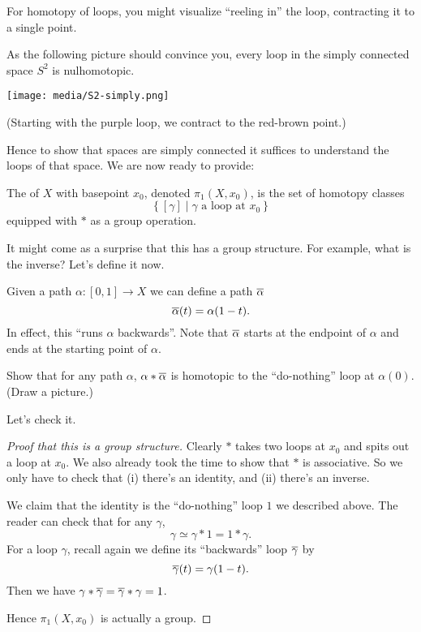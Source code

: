 For homotopy of loops, you might visualize ``reeling in'' the loop, contracting it to a single point.

\begin{example}
	As the following picture should convince you, every loop in
	the simply connected space $S^2$ is nulhomotopic.
	\begin{center}
		\texttt{[image: media/S2-simply.png]}
	\end{center}
	(Starting with the purple loop, we contract to the red-brown point.)
\end{example}

Hence to show that spaces are simply connected it suffices to understand
the loops of that space.
We are now ready to provide:
\begin{definition}
	The  of $X$ with basepoint $x_0$,
	denoted $\pi_1(X, x_0)$, is the set of homotopy classes
	\[ \left\{ [\gamma] \mid \gamma \text{ a loop at $x_0$} \right\} \]
	equipped with $\ast$ as a group operation.
\end{definition}

It might come as a surprise that this has a group structure.
For example, what is the inverse?
Let's define it now.
\begin{definition}
	Given a path $\alpha : [0,1] \to X$ we can define a path $\overline\alpha$
	\[ \overline\alpha (t) = \alpha(1-t). \]
	In effect, this ``runs $\alpha$ backwards''.
	Note that $\overline\alpha$ starts at the endpoint of $\alpha$
	and ends at the starting point of $\alpha$.
\end{definition}
\begin{exercise}
	Show that for any path $\alpha$,
	$\alpha \ast \overline\alpha$ is homotopic
	to the ``do-nothing'' loop at $\alpha(0)$.
	(Draw a picture.)
\end{exercise}

Let's check it.
\begin{proof}
	[Proof that this is a group structure]
	Clearly $\ast$ takes two loops at $x_0$ and spits out a loop at $x_0$.
	We also already took the time to show that $\ast$ is associative.
	So we only have to check that (i) there's an identity, and (ii)
	there's an inverse.
	\begin{itemize}
		\ii We claim that the identity is the ``do-nothing'' loop $1$
		we described above. The reader can check that for any $\gamma$,
		\[ \gamma \simeq \gamma \ast 1 = 1 \ast \gamma. \]
		\ii For a loop $\gamma$, recall again we define its ``backwards'' loop $\overline\gamma$ by
		\[ \overline\gamma(t) = \gamma(1-t). \]
		Then we have $\gamma \ast \overline\gamma = \overline\gamma \ast \gamma = 1$.
	\end{itemize}
	Hence $\pi_1(X,x_0)$ is actually a group.
\end{proof}

